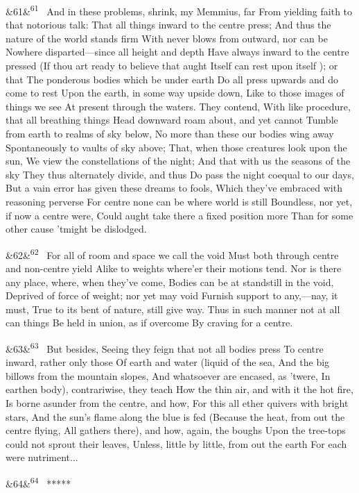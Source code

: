 \documentclass[12pt]{article}
\newcommand{\para}[1][]{\par\noindent\ifx&#1&\else\textsuperscript{\footnotesize #1}~\fi}
\begin{document}
\para[61] And in these problems, shrink, my Memmius, far From yielding faith to that notorious talk: That all things inward to the centre press; And thus the nature of the world stands firm With never blows from outward, nor can be Nowhere disparted---since all height and depth Have always inward to the centre pressed (If thou art ready to believe that aught Itself can rest upon itself ); or that The ponderous bodies which be under earth Do all press upwards and do come to rest Upon the earth, in some way upside down, Like to those images of things we see At present through the waters. They contend, With like procedure, that all breathing things Head downward roam about, and yet cannot Tumble from earth to realms of sky below, No more than these our bodies wing away Spontaneously to vaults of sky above; That, when those creatures look upon the sun, We view the constellations of the night; And that with us the seasons of the sky They thus alternately divide, and thus Do pass the night coequal to our days, But a vain error has given these dreams to fools, Which they've embraced with reasoning perverse For centre none can be where world is still Boundless, nor yet, if now a centre were, Could aught take there a fixed position more Than for some other cause 'tmight be dislodged.

\para[62] For all of room and space we call the void Must both through centre and non-centre yield Alike to weights where'er their motions tend. Nor is there any place, where, when they've come, Bodies can be at standstill in the void, Deprived of force of weight; nor yet may void Furnish support to any,---nay, it must, True to its bent of nature, still give way. Thus in such manner not at all can things Be held in union, as if overcome By craving for a centre.

\para[63] But besides, Seeing they feign that not all bodies press To centre inward, rather only those Of earth and water (liquid of the sea, And the big billows from the mountain slopes, And whatsoever are encased, as 'twere, In earthen body), contrariwise, they teach How the thin air, and with it the hot fire, Is borne asunder from the centre, and how, For this all ether quivers with bright stars, And the sun's flame along the blue is fed (Because the heat, from out the centre flying, All gathers there), and how, again, the boughs Upon the tree-tops could not sprout their leaves, Unless, little by little, from out the earth For each were nutriment...

\para[64] *****
\end{document}
